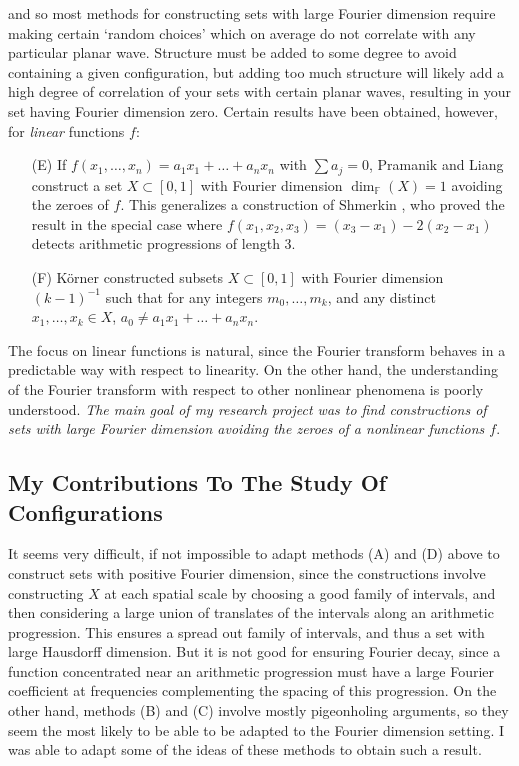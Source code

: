 \documentclass[11pt]{article}
\begin{document}
and so most methods for constructing sets with large Fourier dimension require making certain `random choices' which on average do not correlate with any particular planar wave. Structure must be added to some degree to avoid containing a given configuration, but adding too much structure will likely add a high degree of correlation of your sets with certain planar waves, resulting in your set having Fourier dimension zero. Certain results have been obtained, however, for \emph{linear} functions $f$:
%
\begin{itemize}
	\item[(E)] If $f(x_1,\dots,x_n) = a_1x_1 + \dots + a_nx_n$ with $\sum a_j = 0$, Pramanik and Liang \cite{PramanikLiang} construct a set $X \subset [0,1]$ with Fourier dimension $\dim_{\mathbb{F}}(X) = 1$ avoiding the zeroes of $f$. This generalizes a construction of Shmerkin \cite{Shmerkin}, who proved the result in the special case where $f(x_1,x_2,x_3) = (x_3 - x_1) - 2 (x_2 - x_1)$ detects arithmetic progressions of length 3.

	\item[(F)] K\"{o}rner constructed subsets $X \subset [0,1]$ with Fourier dimension $(k-1)^{-1}$ such that for any integers $m_0,\dots,m_k$, and any distinct $x_1,\dots,x_k \in X$, $a_0 \neq a_1x_1 + \dots + a_nx_n$.
\end{itemize}
%
The focus on linear functions is natural, since the Fourier transform behaves in a predictable way with respect to linearity. On the other hand, the understanding of the Fourier transform with respect to other nonlinear phenomena is poorly understood. \emph{The main goal of my research project was to find constructions of sets with large Fourier dimension avoiding the zeroes of a nonlinear functions $f$}.

\subsection{My Contributions To The Study Of Configurations} \label{MyContributionFractals}

It seems very difficult, if not impossible to adapt methods (A) and (D) above to construct sets with positive Fourier dimension, since the constructions involve constructing $X$ at each spatial scale by choosing a good family of intervals, and then considering a large union of translates of the intervals along an arithmetic progression. This ensures a spread out family of intervals, and thus a set with large Hausdorff dimension. But it is not good for ensuring Fourier decay, since a function concentrated near an arithmetic progression must have a large Fourier coefficient at frequencies complementing the spacing of this progression. On the other hand, methods (B) and (C) involve mostly pigeonholing arguments, so they seem the most likely to be able to be adapted to the Fourier dimension setting. I was able to adapt some of the ideas of these methods to obtain such a result.
\end{document}
